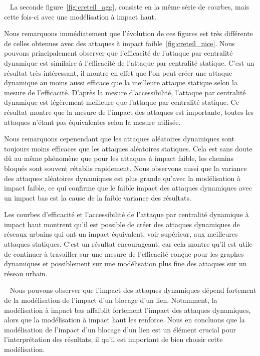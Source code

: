 ~\newline
La seconde figure~\ref{fig:creteil_agg}, consiste en la même série de courbes, mais cette fois-ci avec une modélisation à impact haut.

Nous remarquons immédiatement que l'évolution de ces figures est très différente de celles obtenues avec des attaques à impact faible~\ref{fig:creteil_nice}.
Nous pouvons principalement observer que l'efficacité de l'attaque par centralité dynamique est similaire à l'efficacité de 
l'attaque par centralité statique. C'est un résultat très intéressant, il montre en effet que l'on peut créer une 
attaque dynamique au moins aussi efficace que la meilleure attaque statique selon la mesure de l'efficacité. 
D'après la mesure d'accessibilité, l'attaque par centralité dynamique est légèrement meilleure que l'attaque par centralité 
statique. Ce résultat montre que la mesure de l'impact des attaques est importante, toutes les attaques n'étant pas 
équivalentes selon la mesure utilisée.

Nous remarquons cepenendant que les attaques aléatoires dynamiques sont toujours moins efficaces que les attaques aléatoires statiques. 
Cela est sans doute dû au même phénomène que pour les attaques à impact faible, les chemins bloqués sont souvent rétablis
rapidement.
Nous observons aussi que la variance des attaques aléatoires dynamiques est plus grande qu'avec la modélisation à impact faible,
ce qui confirme que le faible impact des attaques dynamiques avec un impact bas est la cause de la faible variance des résultats.

Les courbes d'efficacité et l'accessibilité de l'attaque par centralité dynamique à impact 
haut montrent qu'il est possible de créer des attaques dynamiques de réseaux urbains qui ont un 
impact équivalent, voir supérieur, aux meilleures attaques statiques. C'est un résultat encourageant,
car cela montre qu'il est utile de continuer à travailler sur une mesure de l'efficacité conçue pour les graphes dynamiques 
et possiblement sur une modélisation plus fine des attaques sur un réseau urbain.

~\newline
Nous pouvons observer que l'impact des attaques dynamiques dépend fortement de la modélisation de l'impact d'un blocage d'un lien.
Notamment, la modélisation à impact bas affaiblit fortement l'impact des attaques dynamiques, alors que la modélisation à impact haut les renforce.
Nous en concluons que la modélisation de l'impact d'un blocage d'un lien est un élément crucial pour l'interprétation des résultats, il qu'il est important de bien choisir cette modélisation.

